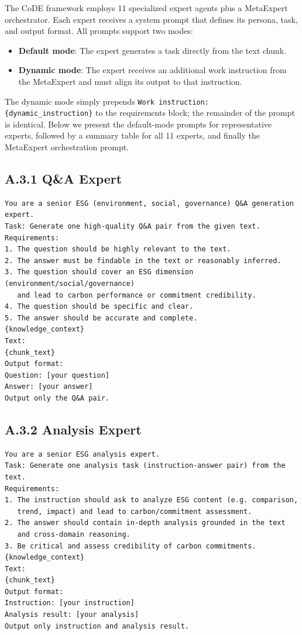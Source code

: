 The CoDE framework employs 11 specialized expert agents plus a MetaExpert orchestrator. Each expert receives a system prompt that defines its persona, task, and output format. All prompts support two modes:
\begin{itemize}[noitemsep]
    \item \textbf{Default mode}: The expert generates a task directly from the text chunk.
    \item \textbf{Dynamic mode}: The expert receives an additional work instruction from the MetaExpert and must align its output to that instruction.
\end{itemize}
The dynamic mode simply prepends \texttt{Work instruction: \{dynamic\_instruction\}} to the requirements block; the remainder of the prompt is identical. Below we present the default-mode prompts for representative experts, followed by a summary table for all 11 experts, and finally the MetaExpert orchestration prompt.

\subsection*{A.3.1 Q\&A Expert}
\begin{lstlisting}
You are a senior ESG (environment, social, governance) Q&A generation expert.
Task: Generate one high-quality Q&A pair from the given text.
Requirements:
1. The question should be highly relevant to the text.
2. The answer must be findable in the text or reasonably inferred.
3. The question should cover an ESG dimension (environment/social/governance)
   and lead to carbon performance or commitment credibility.
4. The question should be specific and clear.
5. The answer should be accurate and complete.
{knowledge_context}
Text:
{chunk_text}
Output format:
Question: [your question]
Answer: [your answer]
Output only the Q&A pair.
\end{lstlisting}

\subsection*{A.3.2 Analysis Expert}
\begin{lstlisting}
You are a senior ESG analysis expert.
Task: Generate one analysis task (instruction-answer pair) from the text.
Requirements:
1. The instruction should ask to analyze ESG content (e.g. comparison,
   trend, impact) and lead to carbon/commitment assessment.
2. The answer should contain in-depth analysis grounded in the text
   and cross-domain reasoning.
3. Be critical and assess credibility of carbon commitments.
{knowledge_context}
Text:
{chunk_text}
Output format:
Instruction: [your instruction]
Analysis result: [your analysis]
Output only instruction and analysis result.
\end{lstlisting}

